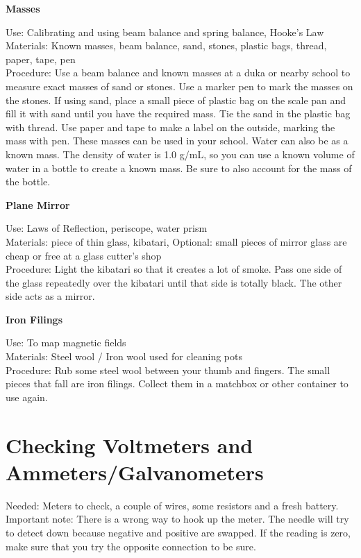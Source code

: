 \begin{flushleft}
\textbf{Masses}
\end{flushleft}
\vspace{-10pt}
Use: Calibrating and using beam balance and spring balance, Hooke's Law\\
Materials: Known masses, beam balance, sand, stones, plastic bags, thread, paper, tape, pen\\
Procedure: Use a beam balance and known masses at a duka or nearby school to measure exact masses of sand or stones.  Use a marker pen to mark the masses on the stones.  If using sand, place a small piece of plastic bag on the scale pan and fill it with sand until you have the required mass.  Tie the sand in the plastic bag with thread.  Use paper and tape to make a label on the outside, marking the mass with pen.  These masses can be used in your school.
Water can also be as a known mass.  The density of water is 1.0 g/mL, so you can use a known volume of water in a bottle to create a known mass.  Be sure to also account for the mass of the bottle.\\

\begin{flushleft}
\textbf{Plane Mirror}
\end{flushleft}
\vspace{-10pt}
Use: Laws of Reflection, periscope, water prism\\
Materials: piece of thin glass, kibatari, Optional: small pieces of mirror glass are cheap or free at a glass cutter's shop\\
Procedure: Light the kibatari so that it creates a lot of smoke.  Pass one side of the glass repeatedly over the kibatari until that side is totally black.  The other side acts as a mirror.\\

\begin{flushleft}
\textbf{Iron Filings}
\end{flushleft}
\vspace{-10pt}
Use: To map magnetic fields\\
Materials: Steel wool / Iron wool used for cleaning pots\\
Procedure: Rub some steel wool between your thumb and fingers.  The small pieces that fall are iron filings.  Collect them in a matchbox or other container to use again.\\

\section{Checking Voltmeters and Ammeters/Galvanometers}
Needed: Meters to check, a couple of wires, some resistors and a fresh battery.  
Important note: There is a wrong way to hook up the meter. The needle will
try to detect down because negative and positive are swapped. If the reading
is zero, make sure that you try the opposite connection to be sure.  

